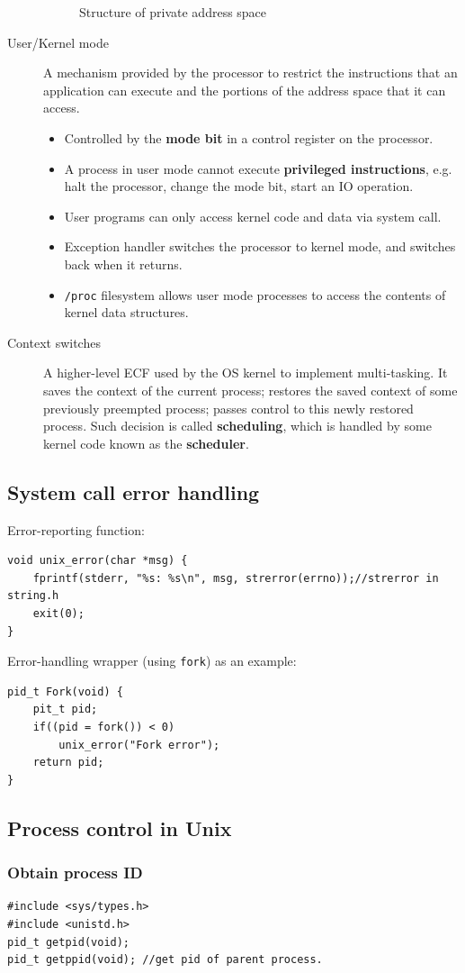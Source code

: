 \begin{description}
\begin{figure}[ht]
	\caption{Structure of private address space}
	\end{figure}
	\item[User/Kernel mode] A mechanism provided by the processor to restrict the instructions that an application can execute and the portions of the address space that it can access.
	\begin{itemize}
		\item Controlled by the \textbf{mode bit} in a control register on the processor. 
		\item A process in user mode cannot execute \textbf{privileged instructions}, e.g. halt the processor, change the mode bit, start an IO operation. 
		\item User programs can only access kernel code and data via system call. 
		\item Exception handler switches the processor to kernel mode, and switches back when it returns.
		\item \texttt{/proc} filesystem allows user mode processes to access the contents of kernel data structures.
	\end{itemize}
	\item[Context switches]A higher-level ECF used by the OS kernel to implement multi-tasking. It saves the context of the current process; restores the saved context of some previously preempted process; passes control to this newly restored process. Such decision is called \textbf{scheduling}, which is handled by some kernel code known as the \textbf{scheduler}.
\end{description}
\subsection{System call error handling}
Error-reporting function:
\begin{lstlisting}[frame=single]
void unix_error(char *msg) {
	fprintf(stderr, "%s: %s\n", msg, strerror(errno));//strerror in string.h
	exit(0);
}
\end{lstlisting}
Error-handling wrapper (using \texttt{fork}) as an example:
\begin{lstlisting}[frame=single]
pid_t Fork(void) {
	pit_t pid;
	if((pid = fork()) < 0)
		unix_error("Fork error");
	return pid;
}
\end{lstlisting}
\subsection{Process control in Unix}
\subsubsection{Obtain process ID}
\begin{lstlisting}[frame=single]
#include <sys/types.h>
#include <unistd.h>
pid_t getpid(void);
pid_t getppid(void); //get pid of parent process.
\end{lstlisting}
